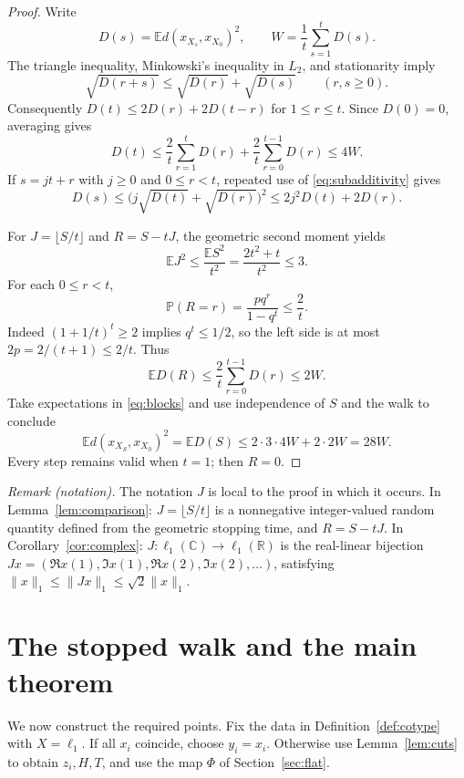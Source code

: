 \documentclass[11pt]{article}
\theoremstyle{definition}
\theoremstyle{remark}
\numberwithin{equation}{section}
\newcommand{\R}{\mathbb R}
\newcommand{\E}{\mathbb E}
\newcommand{\Prob}{\mathbb P}
\begin{document}
\begin{proof}
Write
\[
 D(s)=\E d(x_{X_s},x_{X_0})^2,
 \qquad W=\frac1t\sum_{s=1}^t D(s).
\]
The triangle inequality, Minkowski's inequality in $L_2$, and
stationarity imply
\begin{equation}\label{eq:subadditivity}
 \sqrt{D(r+s)}\leq\sqrt{D(r)}+\sqrt{D(s)}
 \qquad(r,s\geq0).
\end{equation}
Consequently $D(t)\leq2D(r)+2D(t-r)$ for $1\leq r\leq t$.
Since $D(0)=0$, averaging gives
\begin{equation}\label{eq:Dt}
 D(t)\leq\frac2t\sum_{r=1}^tD(r)
          +\frac2t\sum_{r=0}^{t-1}D(r)\leq4W.
\end{equation}
If $s=jt+r$ with $j\geq0$ and $0\leq r<t$, repeated use of
\eqref{eq:subadditivity} gives
\begin{equation}\label{eq:blocks}
 D(s)\leq\bigl(j\sqrt{D(t)}+\sqrt{D(r)}\bigr)^2
        \leq2j^2D(t)+2D(r).
\end{equation}

For $J=\lfloor S/t\rfloor$ and $R=S-tJ$, the geometric
second moment yields
\[
 \E J^2\leq\frac{\E S^2}{t^2}
 =\frac{2t^2+t}{t^2}\leq3.
\]
For each $0\leq r<t$,
\[
 \Prob(R=r)=\frac{pq^r}{1-q^t}\leq\frac2t.
\]
Indeed $(1+1/t)^t\geq2$ implies $q^t\leq1/2$, so the
left side is at most $2p=2/(t+1)\leq2/t$.
Thus
\[
 \E D(R)\leq\frac2t\sum_{r=0}^{t-1}D(r)\leq2W.
\]
Take expectations in \eqref{eq:blocks} and use independence
of $S$ and the walk to conclude
\[
 \E d(x_{X_S},x_{X_0})^2=\E D(S)
 \leq2\cdot3\cdot4W+2\cdot2W=28W.
\]
Every step remains valid when $t=1$; then $R=0$.
\end{proof}

\noindent\textit{Remark (notation).} The notation $J$ is local to the proof in which it occurs. In Lemma~\ref{lem:comparison}: $J=\lfloor S/t\rfloor$ is a nonnegative integer-valued random quantity defined from the geometric stopping time, and $R=S-tJ$. In Corollary~\ref{cor:complex}: $J:\ell_1(\mathbb C)\to\ell_1(\R)$ is the real-linear bijection $Jx=(\Re x(1),\Im x(1),\Re x(2),\Im x(2),\ldots)$, satisfying $\|x\|_1\leq\|Jx\|_1\leq\sqrt2\|x\|_1$.


\section{The stopped walk and the main theorem}
\label{sec:proof}

We now construct the required points. Fix the data in
Definition~\ref{def:cotype} with $X=\ell_1$. If all $x_i$
coincide, choose $y_i=x_i$. Otherwise use Lemma~\ref{lem:cuts}
to obtain $z_i,H,T$, and use the map $\Phi$ of
Section~\ref{sec:flat}.
\end{document}
